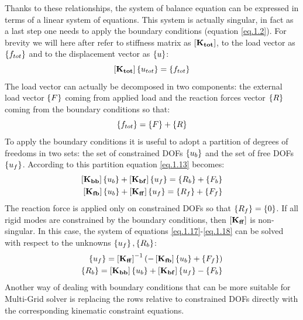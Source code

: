 Thanks to these relationships, the system of balance equation can be expressed in terms of a linear system of equations. This system is actually singular, in fact as a last step one needs to apply the boundary conditions (equation \ref{eq.1.2}). For brevity we will here after refer to stiffness matrix as $\left[{\mathbf{K_{tot}}}\right]$, to the load vector as $\left\lbrace{f_{tot}}\right \rbrace$ and to the displacement vector as  $\left\lbrace{u}\right \rbrace$:
\begin{equation}
\label{eq.1.32}
\left[{\mathbf{K_{tot}}}\right]\left\lbrace{u_{tot}}\right \rbrace=\left\lbrace{f_{tot}}\right \rbrace
\end{equation} The load vector can actually be decomposed in two components: the external load vector $\left\lbrace{F}\right \rbrace$ coming from applied load and the reaction forces vector $\left\lbrace{R}\right \rbrace$ coming from the boundary conditions so that:
\begin{equation}
\left\lbrace{f_{tot}}\right \rbrace=\left\lbrace{F}\right \rbrace+\left\lbrace{R}\right \rbrace
\end{equation}
To apply the boundary conditions it is useful to adopt a partition of degrees of freedoms in two sets:
the set of constrained DOFs $\left\lbrace{u_b}\right \rbrace$ and the set of free DOFs $\left\lbrace{u_f}\right \rbrace$. According to this partition equation \ref{eq.1.13} becomes:
\begin{eqnarray}
\label{eq.1.17}
\left[{\mathbf{K_{bb}}}\right]\left\lbrace{u_b}\right \rbrace+\left[{\mathbf{K_{bf}}}\right]\left\lbrace{u_f}\right \rbrace=\left\lbrace{R_b}\right \rbrace+\left\lbrace{F_b}\right \rbrace\\
\label{eq.1.18}
\left[{\mathbf{K_{fb}}}\right]\left\lbrace{u_b}\right \rbrace+\left[{\mathbf{K_{ff}}}\right]\left\lbrace{u_f}\right \rbrace=\left\lbrace{R_f}\right \rbrace+\left\lbrace{F_f}\right \rbrace
\end{eqnarray}
The reaction force is applied only on constrained DOFs so that $\left\lbrace{R_f}\right \rbrace=\left\lbrace{0}\right \rbrace$. If all rigid modes are constrained by the boundary conditions, then $\left[{\mathbf{K_{ff}}}\right]$ is non-singular.
 In this case, the system of equations \ref{eq.1.17}-\ref{eq.1.18} can be solved with respect to the unknowns $\left\lbrace{u_f}\right \rbrace,\left\lbrace{R_b}\right \rbrace$:
\begin{eqnarray}
\label{eq.1.19}
\left\lbrace{u_f}\right \rbrace=\left[{\mathbf{K_{ff}}}\right]^{-1}\left(-\left[{\mathbf{K_{fb}}}\right]\left\lbrace{u_b}\right \rbrace+\left\lbrace{F_f}\right \rbrace\right)\\
\label{eq.1.20}
\left\lbrace{R_b}\right \rbrace=\left[{\mathbf{K_{bb}}}\right]\left\lbrace{u_b}\right \rbrace+\left[{\mathbf{K_{bf}}}\right]\left\lbrace{u_f}\right \rbrace-\left\lbrace{F_b}\right \rbrace
\end{eqnarray}
Another way of dealing with boundary conditions that can be more suitable for Multi-Grid solver is replacing the rows relative to constrained DOFs directly with the corresponding kinematic constraint equations.
